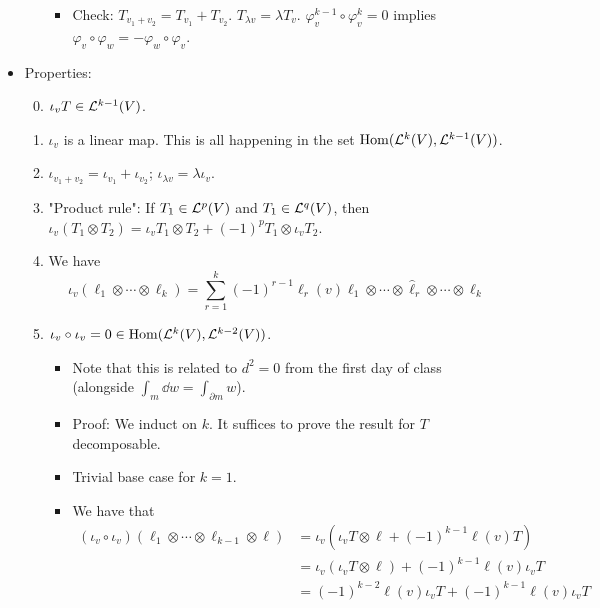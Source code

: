 \documentclass[../notes.tex]{subfiles}
\begin{document}
\begin{itemize}
\begin{itemize}
\begin{equation*}
        \end{equation*}
        \begin{itemize}
            \item Check: $T_{v_1+v_2}=T_{v_1}+T_{v_2}$. $T_{\lambda v}=\lambda T_v$. $\varphi_v^{k-1}\circ\varphi_v^k=0$ implies $\varphi_v\circ\varphi_w=-\varphi_w\circ\varphi_v$.
        \end{itemize}
    \end{itemize}
    \item Properties:
    \begin{enumerate}
        \setcounter{enumi}{-1}
        \item $\iota_vT\in\lin[k-1]{V}$.
        \item $\iota_v$ is a linear map. This is all happening in the set $\Hom(\lin[k]{V},\lin[k-1]{V})$.
        \item $\iota_{v_1+v_2}=\iota_{v_1}+\iota_{v_2}$; $\iota_{\lambda v}=\lambda\iota_v$.
        \item "Product rule": If $T_1\in\lin[p]{V}$ and $T_1\in\lin[q]{V}$, then $\iota_v(T_1\otimes T_2)=\iota_vT_1\otimes T_2+(-1)^pT_1\otimes\iota_vT_2$.
        \item We have
        \begin{equation*}
            \iota_v(\ell_1\otimes\cdots\otimes\ell_k) = \sum_{r=1}^k(-1)^{r-1}\ell_r(v)\ell_1\otimes\cdots\otimes\hat{\ell}_r\otimes\cdots\otimes\ell_k
        \end{equation*}
        \item $\iota_v\circ\iota_v=0\in\Hom(\lin[k]{V},\lin[k-2]{V})$.
        \begin{itemize}
            \item Note that this is related to $d^2=0$ from the first day of class (alongside $\int_m\dd{w}=\int_{\partial m}w$).
            \item Proof: We induct on $k$. It suffices to prove the result for $T$ decomposable.
            \item Trivial base case for $k=1$.
            \item We have that
            \begin{align*}
                (\iota_v\circ\iota_v)(\ell_1\otimes\cdots\otimes\ell_{k-1}\otimes\ell) &= \iota_v(\iota_vT\otimes\ell+(-1)^{k-1}\ell(v)T)\\
                &= \iota_v(\iota_vT\otimes\ell)+(-1)^{k-1}\ell(v)\iota_vT\\
                &= (-1)^{k-2}\ell(v)\iota_vT+(-1)^{k-1}\ell(v)\iota_vT\\

\end{align*}
\end{itemize}
\end{enumerate}
\end{itemize}
\end{document}
